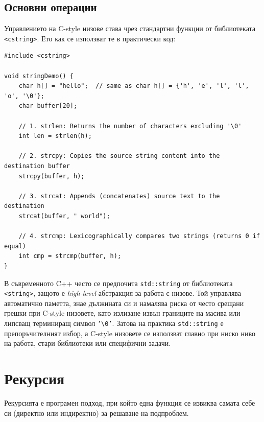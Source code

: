 \documentclass{scrartcl}
\begin{document}
\begin{FlushLeft}
\subsection{Основни операции}
Управлението на C-style низове става чрез стандартни функции от библиотеката \texttt{<cstring>}. Ето как се използват те в практически код:
\begin{lstlisting}
#include <cstring>

void stringDemo() {
    char h[] = "hello";  // same as char h[] = {'h', 'e', 'l', 'l', 'o', '\0'};
    char buffer[20];

    // 1. strlen: Returns the number of characters excluding '\0'
    int len = strlen(h); 

    // 2. strcpy: Copies the source string content into the destination buffer
    strcpy(buffer, h);

    // 3. strcat: Appends (concatenates) source text to the destination
    strcat(buffer, " world");

    // 4. strcmp: Lexicographically compares two strings (returns 0 if equal)
    int cmp = strcmp(buffer, h);
}
\end{lstlisting}

В съвременното C++ често се предпочита \texttt{std::string} от библиотеката \texttt{<string>}, защото е \textit{high-level} абстракция за работа с низове. Той управлява автоматично паметта, знае дължината си и намалява риска от често срещани грешки при C-style низовете, като излизане извън границите на масива или липсващ терминиращ символ \texttt{'\textbackslash 0'}. Затова на практика \texttt{std::string} е препоръчителният избор, а C-style низовете се използват главно при ниско ниво на работа, стари библиотеки или специфични задачи.

\section{Рекурсия}
Рекурсията е програмен подход, при който една функция се извиква самата себе си (директно или индиректно) за решаване на подпроблем. 


\end{FlushLeft}
\end{document}

